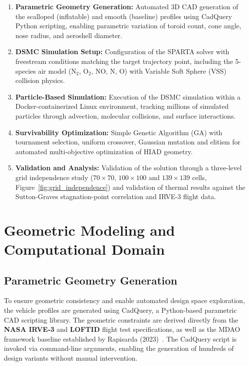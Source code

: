\begin{enumerate}
    \item \textbf{Parametric Geometry Generation:} Automated 3D CAD generation of the scalloped (inflatable) and smooth (baseline) profiles using CadQuery Python scripting, enabling parametric variation of toroid count, cone angle, nose radius, and aeroshell diameter.
    \item \textbf{DSMC Simulation Setup:} Configuration of the SPARTA solver with freestream conditions matching the target trajectory point, including the 5-species air model (N$_2$, O$_2$, NO, N, O) with Variable Soft Sphere (VSS) collision physics.
    \item \textbf{Particle-Based Simulation:} Execution of the DSMC simulation within a Docker-containerized Linux environment, tracking millions of simulated particles through advection, molecular collisions, and surface interactions.
    \item \textbf{Survivability Optimization:} Simple Genetic Algorithm (GA) with tournament selection, uniform crossover, Gaussian mutation and elitism for automated multi-objective optimization of HIAD geometry.
    \item \textbf{Validation and Analysis:} Validation of the solution through a three-level grid independence study ($70\times70$, $100\times100$ and $139\times139$ cells, Figure~\ref{fig:grid_independence}) and validation of thermal results against the Sutton-Graves stagnation-point correlation and IRVE-3 flight data.
\end{enumerate}

\section{Geometric Modeling and Computational Domain}

\subsection{Parametric Geometry Generation}
To ensure geometric consistency and enable automated design space exploration, the vehicle profiles are generated using CadQuery, a Python-based parametric CAD scripting library. The geometric constraints are derived directly from the \textbf{NASA IRVE-3} and \textbf{LOFTID} flight test specifications, as well as the MDAO framework baseline established by Rapisarda (2023)~\cite{rapisarda2023mdao}. The CadQuery script is invoked via command-line arguments, enabling the generation of hundreds of design variants without manual intervention.

